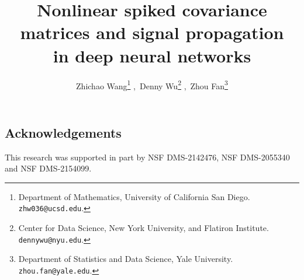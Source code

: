 \documentclass{article}
\title{Nonlinear spiked covariance matrices and signal propagation\\
 in deep neural networks}
\author{
Zhichao Wang\thanks{Department of Mathematics, University of California San Diego.  \texttt{zhw036@ucsd.edu}.} ,\,
Denny Wu\thanks{Center for Data Science, New York University, and Flatiron Institute. \texttt{dennywu@nyu.edu}.} ,\,
Zhou Fan\thanks{Department of Statistics and Data Science, Yale University. \texttt{zhou.fan@yale.edu}. 
} 

}
\date{}
\begin{document}
\maketitle




\subsection*{Acknowledgements}
This research was supported in part by NSF DMS-2142476, NSF DMS-2055340 and NSF DMS-2154099.


{
\fontsize{10}{11}\selectfont  
 

 


}
\appendix


\end{document}

